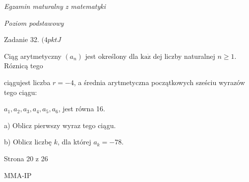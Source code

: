 \documentclass[a4paper,12pt]{article}
\begin{document}
{\it Egzamin maturalny z matematyki}

{\it Poziom podstawowy}

Zadanie 32. $(4pktJ$

Ciąg arytmetyczny $(a_{n})$ jest określony dla $\mathrm{k}\mathrm{a}\dot{\mathrm{z}}$ dej liczby naturalnej $n\geq 1$. Róznicą tego

ciągujest liczba $r=-4$, a średnia arytmetyczna początkowych sześciu wyrazów tego ciągu:

$a_{1}, a_{2}, a_{3}, a_{4}, a_{5}, a_{6}$, jest równa 16.

a) Oblicz pierwszy wyraz tego ciągu.

b) Oblicz liczbę $k$, dla której $a_{k}=-78.$

Strona 20 z 26

MMA-IP
\end{document}
